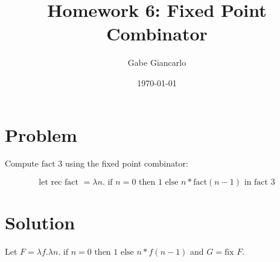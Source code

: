 \documentclass[12pt]{article}
\title{Homework 6: Fixed Point Combinator}
\author{Gabe Giancarlo}
\date{\today}
\begin{document}
\maketitle

\section{Problem}

Compute $\text{fact } 3$ using the fixed point combinator:

$$\text{let rec fact } = \lambda n.\text{ if } n=0 \text{ then } 1 \text{ else } n * \text{fact}(n-1) \text{ in fact } 3$$

\section{Solution}

Let $F = \lambda f.\lambda n.\text{ if } n=0 \text{ then } 1 \text{ else } n * f(n-1)$ and $G = \text{fix } F$.
\end{document}
